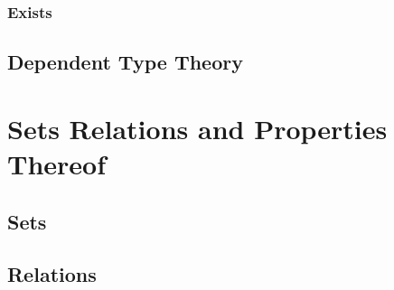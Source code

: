 \documentclass{book}
\begin{document}
\hypertarget{pandoc.profile.debug__pandoc__debug__src__dmt1__lectures__l07_predicatelogic__05_quantifiers_exists.lean.md}{}
\hypertarget{pandoc.profile.debug__pandoc__debug__src__dmt1__lectures__l07_predicatelogic__05_quantifiers_exists.lean.md__exists}{%
\subsection{Exists}\label{pandoc.profile.debug__pandoc__debug__src__dmt1__lectures__l07_predicatelogic__05_quantifiers_exists.lean.md__exists}}

\hypertarget{pandoc.profile.debug__pandoc__debug__src__dmt1__lectures__l07_predicatelogic__06_dependenttypes.lean.md}{}
\hypertarget{pandoc.profile.debug__pandoc__debug__src__dmt1__lectures__l07_predicatelogic__06_dependenttypes.lean.md__dependent-type-theory}{%
\section{Dependent Type Theory}\label{pandoc.profile.debug__pandoc__debug__src__dmt1__lectures__l07_predicatelogic__06_dependenttypes.lean.md__dependent-type-theory}}

\hypertarget{pandoc.profile.debug__pandoc__debug__src__settheory}{}
\hypertarget{pandoc.profile.debug__pandoc__debug__src__settheory__sets-relations-and-properties-thereof}{%
\chapter{Sets Relations and Properties Thereof}\label{pandoc.profile.debug__pandoc__debug__src__settheory__sets-relations-and-properties-thereof}}

\hypertarget{pandoc.profile.debug__pandoc__debug__src__dmt1__lectures__l08_setsrelationsfunctions__c01_sets.lean.md}{}
\hypertarget{pandoc.profile.debug__pandoc__debug__src__dmt1__lectures__l08_setsrelationsfunctions__c01_sets.lean.md__sets}{%
\section{Sets}\label{pandoc.profile.debug__pandoc__debug__src__dmt1__lectures__l08_setsrelationsfunctions__c01_sets.lean.md__sets}}

\hypertarget{pandoc.profile.debug__pandoc__debug__src__dmt1__lectures__l08_setsrelationsfunctions__c02_relations.lean.md}{}
\hypertarget{pandoc.profile.debug__pandoc__debug__src__dmt1__lectures__l08_setsrelationsfunctions__c02_relations.lean.md__relations}{%
\section{Relations}\label{pandoc.profile.debug__pandoc__debug__src__dmt1__lectures__l08_setsrelationsfunctions__c02_relations.lean.md__relations}}
\end{document}
